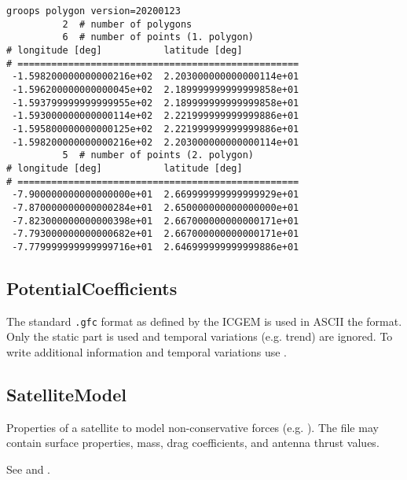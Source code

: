 \begin{verbatim}
groops polygon version=20200123
          2  # number of polygons
          6  # number of points (1. polygon)
# longitude [deg]           latitude [deg]
# ==================================================
 -1.598200000000000216e+02  2.203000000000000114e+01
 -1.596200000000000045e+02  2.189999999999999858e+01
 -1.593799999999999955e+02  2.189999999999999858e+01
 -1.593000000000000114e+02  2.221999999999999886e+01
 -1.595800000000000125e+02  2.221999999999999886e+01
 -1.598200000000000216e+02  2.203000000000000114e+01
          5  # number of points (2. polygon)
# longitude [deg]           latitude [deg]
# ==================================================
 -7.900000000000000000e+01  2.669999999999999929e+01
 -7.870000000000000284e+01  2.650000000000000000e+01
 -7.823000000000000398e+01  2.667000000000000171e+01
 -7.793000000000000682e+01  2.667000000000000171e+01
 -7.779999999999999716e+01  2.646999999999999886e+01
\end{verbatim}



\subsection{PotentialCoefficients}\label{general.fileFormat:potentialCoefficients}
The standard \verb|.gfc| format as defined by the ICGEM is used in ASCII the format.
Only the static part is used and temporal variations (e.g. trend) are ignored.
To write additional information and temporal variations use .


\subsection{SatelliteModel}\label{general.fileFormat:satelliteModel}
Properties of a satellite to model non-conservative forces (e.g. ).
The file may contain surface properties, mass, drag coefficients, and antenna thrust values.

See  and .

